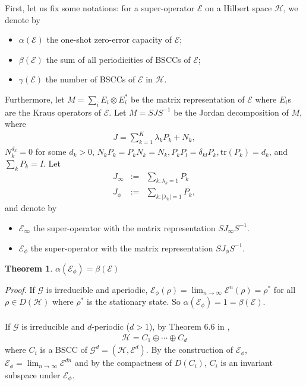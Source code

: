 \documentclass{article}
\def\h{\ensuremath{\mathcal{H}}}
\def\e{\ensuremath{\mathcal{E}}}
\def\E{\mathcal{E}}
\def\G{\mathcal{G}}
\def\H{\mathcal{H}}
\newtheorem{theorem}{Theorem}
\begin{document}
%
First, let us fix some notations: for a super-operator $\e$ on a Hilbert space $\h$, we denote by
\begin{itemize}
\item $\alpha(\e)$ the one-shot zero-error capacity of $\e$;
\item $\beta(\e)$ the sum of all periodicities of BSCCs of $\e$;
\item $\gamma(\e)$  the number of BSCCs of $\e$ in $\h$.
\end{itemize}
Furthermore, let $M=\sum_{i}E_{i}\otimes E_{i}^{*}$ be the matrix representation of $\mathcal{E}$ where $E_i$s are the Kraus operators of $\e$. Let $M=SJS^{-1}$ be the Jordan decomposition of $M$, where
\begin{eqnarray*}
J=\sum_{k=1}^{K}\lambda_{k}P_k+N_k,
\end{eqnarray*}
$N_{k}^{d_k}=0$ for some $d_k>0$, $N_{k}P_{k}=P_{k}N_{k}=N_{k}, P_{k}P_{l}=\delta_{kl}P_{k}, \textrm{tr}(P_{k})=d_k$, and  $\sum_{k}P_{k}=I$. Let
\begin{eqnarray}
J_{\infty}& := &\sum_{k:\lambda_{k}=1}P_{k} \label{eq:infty}\\
J_{\phi}& := &\sum_{k:|\lambda_{k}|=1}P_{k}, \label{eq:ephi}
\end{eqnarray}
and denote by
\begin{itemize}
\item $\e_\infty$ the super-operator with the matrix representation $SJ_{\infty} S^{-1}$. 
\item $\e_\phi $ the super-operator with the matrix representation $SJ_{\phi} S^{-1}$. 
\end{itemize}

\begin{theorem}
$\alpha(\E_{\phi})=\beta(\E)$
\end{theorem}
{\it Proof.}
If $\G$ is irreducible and aperiodic, $\E_{\phi}(\rho)=\lim_{n\rightarrow\infty}\E^{n}(\rho)=\rho^{*}$ for all $\rho\in D(\H)$ where $\rho^{*}$ is the stationary state. So $\alpha(\E_{\phi})=1=\beta(\E)$.\\\\

If $\G$ is irreducible and $d$-periodic ($d>1$), by Theorem 6.6 in \cite{wolf2012quantum}, 
\begin{eqnarray*}
\H=C_{1}\oplus\cdots\oplus C_{d}
\end{eqnarray*}
where $C_{i}$ is a BSCC of $\G^{d}=(\H,\E^{d})$. By the construction of $\E_{\phi}$, $\E_{\phi}=\lim_{n\rightarrow\infty}\E^{dn}$ and by the compactness of $D(C_{i})$, $C_{i}$ is an invariant subspace under $\E_{\phi}$.\\
\end{document}
